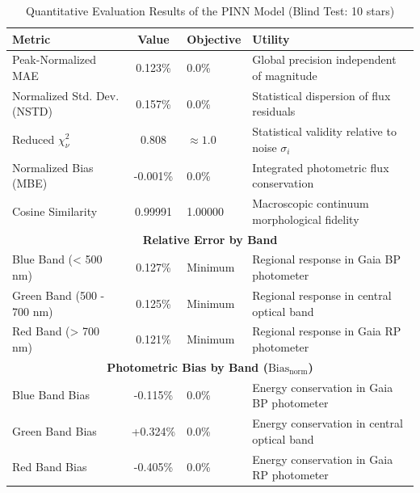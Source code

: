 
\begin{table}[htpb]
\centering
\caption{Quantitative Evaluation Results of the PINN Model (Blind Test: 10 stars)}
\label{tab:pinn_evaluation}
\begin{tabular}{lcll}
\hline
\textbf{Metric} & \textbf{Value} & \textbf{Objective} & \textbf{Utility} \\
\hline
Peak-Normalized MAE & 0.123\% & 0.0\% & Global precision independent of magnitude \\
Normalized Std. Dev. (NSTD) & 0.157\% & 0.0\% & Statistical dispersion of flux residuals \\
Reduced $\chi^2_\nu$ & 0.808 & $\approx 1.0$ & Statistical validity relative to noise $\sigma_i$ \\
Normalized Bias (MBE) & -0.001\% & 0.0\% & Integrated photometric flux conservation \\
Cosine Similarity & 0.99991 & 1.00000 & Macroscopic continuum morphological fidelity \\
\hline
\multicolumn{4}{c}{\textbf{Relative Error by Band}} \\
\hline
Blue Band (< 500 nm) & 0.127\% & Minimum & Regional response in Gaia BP photometer \\
Green Band (500 - 700 nm) & 0.125\% & Minimum & Regional response in central optical band \\
Red Band (> 700 nm) & 0.121\% & Minimum & Regional response in Gaia RP photometer \\
\hline
\multicolumn{4}{c}{\textbf{Photometric Bias by Band ($\text{Bias}_{\text{norm}}$)}} \\
\hline
Blue Band Bias & -0.115\% & 0.0\% & Energy conservation in Gaia BP photometer \\
Green Band Bias & +0.324\% & 0.0\% & Energy conservation in central optical band \\
Red Band Bias & -0.405\% & 0.0\% & Energy conservation in Gaia RP photometer \\
\hline
\end{tabular}
\end{table}
